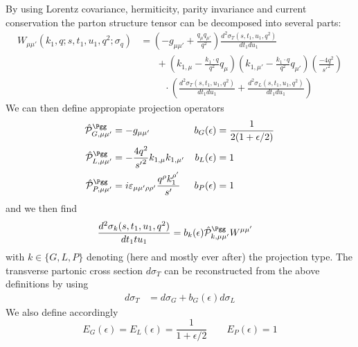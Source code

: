By using Lorentz covariance, hermiticity, parity invariance and current conservation the parton structure tensor can be decomposed into several parts:
\begin{align}
W_{\mu\mu'}(k_1,q;s,t_1,u_1,q^2;\sigma_{q}) &= \left(-g_{\mu\mu'} + \frac{q_\mu q_{\mu'}}{q^2}\right)\frac{d^2\sigma_T(s,t_1,u_1,q^2)}{dt_1du_1} \nonumber\\
 &\hspace{20pt} +\left(k_{1,\mu}-\frac{k_1\cdot q}{q^2}q_\mu\right)\left(k_{1,\mu'}-\frac{k_1\cdot q}{q^2}q_{\mu'}\right)\left(\frac{-4q^2}{{s'}^2}\right) \nonumber\\
 &\hspace{30pt} \cdot\left(\frac{d^2\sigma_T(s,t_1,u_1,q^2)}{dt_1du_1}+\frac{d^2\sigma_L(s,t_1,u_1,q^2)}{dt_1du_1}\right)
\end{align}
We can then define appropiate projection operators\cite{Laenen1993162,Vogelsang:1993eg}
\begin{align}
\hat {\mathcal P}^{\Pgg}_{G,\mu\mu'} &= -g_{\mu\mu'} &b_G(\epsilon) &= \frac 1 {2(1+\epsilon/2)}\\
\hat {\mathcal P}^{\Pgg}_{L,\mu\mu'} &= -\frac{4q^2}{{s'}^2} k_{1,\mu}k_{1,\mu'} &b_L(\epsilon) &= 1\\
\hat {\mathcal P}^{\Pgg}_{P,\mu\mu'} &= i\varepsilon_{\mu\mu'\rho\rho'}\frac{q^{\rho}k_1^{\rho'}}{s'} &b_P(\epsilon) &= 1
\end{align}
 and we then find
\begin{align}
\frac{d^2\sigma_{k}(s,t_1,u_1,q^2)}{dt_1tu_1} &= b_k(\epsilon)\hat {\mathcal P}^{\Pgg}_{k,\mu\mu'}W^{\mu\mu'}
\end{align}
with $k\in\{G,L,P\}$ denoting (here and mostly ever after) the projection type. The transverse partonic cross section $d\sigma_T$ can be reconstructed from the above definitions by using
\begin{align}
d\sigma_T &= d\sigma_G + b_G(\epsilon)d\sigma_L
\end{align}
We also define accordingly
\begin{equation}
E_G(\epsilon) = E_L(\epsilon) = \frac 1 {1+\epsilon/2} \qquad E_P(\epsilon) = 1
\end{equation}

